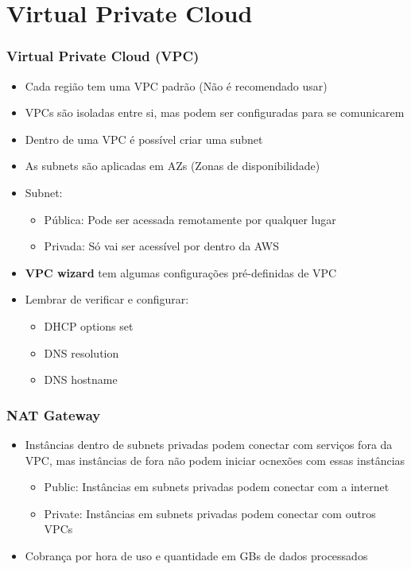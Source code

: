 \section{Virtual Private Cloud}

\begin{frame}
	\frametitle{Virtual Private Cloud (VPC)}
	\begin{itemize}
		\item Cada região tem uma VPC padrão (Não é recomendado usar)
		\item VPCs são isoladas entre si, mas podem ser configuradas para se comunicarem
		\item Dentro de uma VPC é possível criar uma subnet
		\item As subnets são aplicadas em AZs (Zonas de disponibilidade)
		\item Subnet:
			\begin{itemize}
				\item Pública: Pode ser acessada remotamente por qualquer lugar
				\item Privada: Só vai ser acessível por dentro da AWS
			\end{itemize}
		\item \textbf{VPC wizard} tem algumas configurações pré-definidas de VPC
		\item Lembrar de verificar e configurar:
		\begin{itemize}
			\item DHCP options set
			\item DNS resolution
			\item DNS hostname
		\end{itemize}
	\end{itemize}
\end{frame}

\begin{frame}
	\frametitle{NAT Gateway}
	\begin{itemize}
		\item Instâncias dentro de subnets privadas podem conectar com serviços fora da VPC, mas instâncias de fora não podem iniciar ocnexões com essas instâncias
			\begin{itemize}
				\item Public: Instâncias em subnets privadas podem conectar com a internet
				\item Private: Instâncias em subnets privadas podem conectar com outros VPCs
			\end{itemize}
		\item Cobrança por hora de uso e quantidade em GBs de dados processados
	\end{itemize}
\end{frame}

